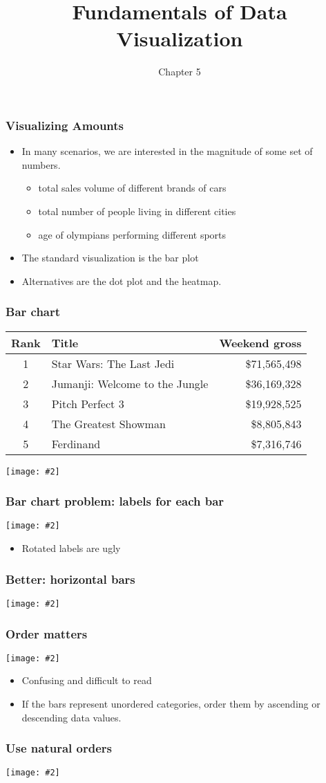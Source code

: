 \documentclass{beamer}
\title{Fundamentals of Data Visualization}
\author{Chapter 5}
\newcommand{\bi}{\begin{itemize}}
\newcommand{\li}{\item}
\newcommand{\ei}{\end{itemize}}
\newcommand{\fig}[2]{\centerline{\texttt{[image: \#2]}}}
\newcommand{\bfr}[1]{\begin{frame}[fragile]\frametitle{{ #1 }}}
\begin{document}
\begin{frame}
\maketitle
\end{frame}

\bfr{Visualizing Amounts}
\bi
\li In many scenarios, we are interested in the magnitude of some set of numbers.
  \bi
  \li total sales volume of different brands of cars
  \li total number of people living in different cities
  \li age of olympians performing different sports
  \ei
\li The standard visualization is the bar plot
\li Alternatives are the dot plot and the heatmap.
\ei

\end{frame}

\bfr{Bar chart}
\small
\begin{center}
\begin{tabular}{clr}
Rank & Title & Weekend gross \\\hline
1	&Star Wars: The Last Jedi&	\$71,565,498		\\
2	&Jumanji: Welcome to the Jungle	&\$36,169,328		\\
3	&Pitch Perfect 3	&\$19,928,525		\\
4	&The Greatest Showman&	\$8,805,843		\\
5&	Ferdinand	&\$7,316,746	
\end{tabular}
\end{center}
\fig{.8}{boxoffice-vertical-1.png}
\end{frame}

\bfr{Bar chart problem: labels for each bar}
\fig{.8}{boxoffice-rot-axis-tick-labels-1.png}
\bi
\li Rotated labels are ugly
\ei
\end{frame}

\bfr{Better: horizontal bars}
\fig{1}{boxoffice-horizontal-1.png}
\end{frame}

\bfr{Order matters}

\fig{.9}{boxoffice-horizontal-bad-order-1}
\bi
\li Confusing and difficult to read
\li  If the bars represent unordered categories, order them by ascending or descending data values.
\ei
\end{frame}

\bfr{Use natural orders}

\fig{1}{income-by-age-1.png} 

\end{frame}
\end{document}
